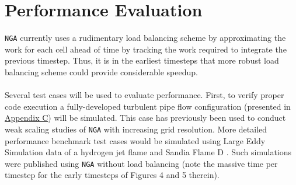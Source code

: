 \documentclass{homework}
\begin{document}

\section{\textbf{Performance Evaluation}}
\noindent \texttt{NGA} currently uses a rudimentary load balancing scheme by approximating the work for each cell ahead of time by tracking the work required to integrate the previous timestep. Thus, it is in the earliest timesteps that more robust load balancing scheme could provide considerable speedup.
\\ \\ \noindent
Several test cases will be used to evaluate performance. First, to verify proper code execution a fully-developed turbulent pipe flow configuration (presented in \hyperref[appendixC]{Appendix C}) will be simulated. This case has previously been used to conduct weak scaling studies of \texttt{NGA} with increasing grid resolution. More detailed performance benchmark test cases would be simulated using Large Eddy Simulation data of a hydrogen jet flame \cite{TNF,BARLOW1994,BARLOW1996} and Sandia Flame D \cite{BARLOW1998}. Such simulations were published\cite{LACEY2021} using \texttt{NGA} without load balancing (note the massive time per timestep for the early timesteps of Figures 4 and 5 therein).
\end{document}
